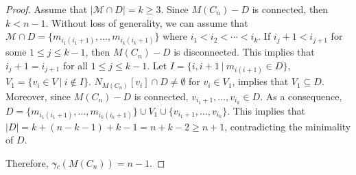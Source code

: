 \documentclass[a4paper,12pt, reqno]{amsart}
\begin{document}
\begin{proof}


Assume that $|\mathcal{M} \cap D|=k \geq 3$. Since $M(C_n)-D$ is connected, then $k<n-1$. Without loss of generality, we can assume that $\mathcal{M} \cap D=\{m_{i_1(i_1+1)},\dots,m_{i_k(i_k+1)}\}$ where $i_1<i_2<\cdots<i_k$. If $i_j+1<i_{j+1}$ for some $1\le j\le k-1$, then $M(C_n)-D$ is disconnected. This implies that $i_j+1=i_{j+1}$ for all $1\le j\le k-1$. Let $I=\{i,i+1~|~m_{i(i+1)} \in D\}$, $V_1=\{v_i \in V~|~ i \notin I\}$. $N_{M(C_{n})}[v_i]\cap D \neq \emptyset$ for  $v_i \in V_1$, implies that $V_1 \subseteq D$. Moreover, since $M(C_n)-D$ is connected, $v_{i_1+1}, \dots, v_{i_k}\in D$.
As a consequence, $D=\{m_{i_1(i_1+1)},\dots,m_{i_k(i_k+1)}\}\cup V_1\cup \{v_{i_1+1}, \dots, v_{i_k}\}$. This implies that $|D|=k+(n-k-1)+k-1=n+k-2\ge n+1$, contradicting the minimality of $D$.


Therefore, $\gamma{\tilde{}} _{c}(M(C_{n}))= n-1.$
\end{proof}
\end{document}

